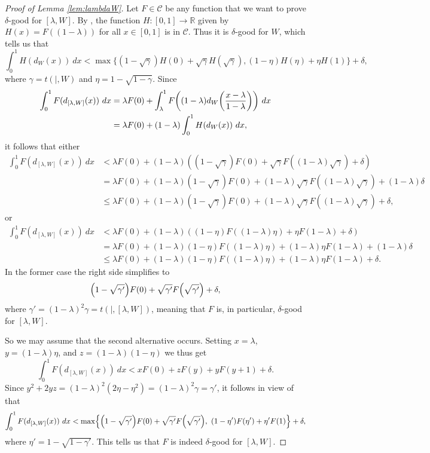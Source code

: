 \documentclass[11pt]{article}
\let\originalleft\left
\let\originalright\right
\renewcommand{\left}{\mathopen{}\mathclose\bgroup\originalleft}
\renewcommand{\right}{\aftergroup\egroup\originalright}
\theoremstyle{definition}
\newcommand{\paren}[1]{\left( #1 \right)}
\newcommand{\brac}[1]{\left\{ #1 \right\}}
\newcommand{\R}{\mathbb{R}}
\newcommand{\C}{\mathscr{C}}
\begin{document}
\begin{proof}[Proof of Lemma \ref{lem:lambdaW}]
    Let $F \in \C$ be any function that we want to prove $\delta$-good for $[\lambda, W]$. By \cite[Lemma 3.1(iii)]{RW}, the function $H: [0,1] \to \R$ given by $H(x) = F ((1 - \lambda))$ for all $x \in [0,1]$ is in $\C$. Thus it is $\delta$-good for $W$, which tells us that \[ \int_0^1 H (d_W (x)) ~dx < \max \{ (1 - \sqrt{\gamma}) H(0) + \sqrt{\gamma} H (\sqrt{\gamma}), (1 - \eta) H (\eta) + \eta H(1) \} + \delta, \] where $\gamma = t (|, W)$ and $\eta = 1 - \sqrt{1 - \gamma}$. Since \begin{align*}
        \int_0^1 F (d_{[\lambda, W]} (x)) ~dx &= \lambda F(0) + \int_\lambda^1 F \paren{(1 - \lambda) d_W \paren{\frac{x - \lambda}{1 - \lambda}}} ~dx \\
        &= \lambda F(0) + (1 - \lambda) \int_0^1 H (d_W (x)) ~dx,
    \end{align*} it follows that either \begin{align*}
        \int_0^1 F (d_{[\lambda, W]} (x)) ~dx &< \lambda F(0) + (1 - \lambda) ((1 - \sqrt{\gamma}) F(0) + \sqrt{\gamma} F ((1 - \lambda) \sqrt{\gamma}) + \delta) \\
        &= \lambda F(0) + (1 - \lambda) (1 - \sqrt{\gamma}) F(0) +  (1 - \lambda) \sqrt{\gamma} F ((1 - \lambda) \sqrt{\gamma}) + (1 - \lambda) \delta \\
        &\le \lambda F(0) + (1 - \lambda) (1 - \sqrt{\gamma}) F(0) +  (1 - \lambda) \sqrt{\gamma} F ((1 - \lambda) \sqrt{\gamma}) + \delta,
    \end{align*} or \begin{align*}
        \int_0^1 F (d_{[\lambda, W]} (x)) ~dx &< \lambda F(0) + (1 - \lambda) ((1 - \eta) F ((1 - \lambda) \eta) + \eta F (1 - \lambda) + \delta) \\
        &= \lambda F(0) + (1 - \lambda) (1 - \eta) F ((1 - \lambda) \eta) + (1 - \lambda) \eta F (1 - \lambda) + (1 - \lambda) \delta \\
        &\le \lambda F(0) + (1 - \lambda) (1 - \eta) F ((1 - \lambda) \eta) + (1 - \lambda) \eta F (1 - \lambda) + \delta.
    \end{align*} In the former case the right side simplifies to \[ \paren{1 - \sqrt{\gamma'}} F (0) + \sqrt{\gamma'} F \paren{\sqrt{\gamma'}} + \delta, \] where $\gamma' = (1 - \lambda)^2 \gamma = t (|, [\lambda, W])$, meaning that $F$ is, in particular, $\delta$-good for $[\lambda, W]$.

    So we may assume that the second alternative occurs. Setting $x = \lambda$, $y = (1 - \lambda) \eta$, and $z = (1 - \lambda) (1 - \eta)$ we thus get \[ \int_0^1 F (d_{[\lambda, W]} (x)) ~dx < x F(0) + z F(y) + y F(y+1) + \delta.\] Since $y^2 + 2yz = (1 - \lambda)^2 (2 \eta - \eta^2) = (1 - \lambda)^2 \gamma = \gamma'$, it follows in view of \cite[Lemma 3.3]{RW} that \[ \int_0^1 F (d_{[\lambda, W]} (x)) ~dx < \max \brac{\paren{1 - \sqrt{\gamma'}} F (0) + \sqrt{\gamma'} F \paren{\sqrt{\gamma'}},~ (1 - \eta') F(\eta') + \eta' F(1)} + \delta, \] where $\eta' = 1 - \sqrt{1 - \gamma'}$. This tells us that $F$ is indeed $\delta$-good for $[\lambda, W]$.
\end{proof}
\end{document}
